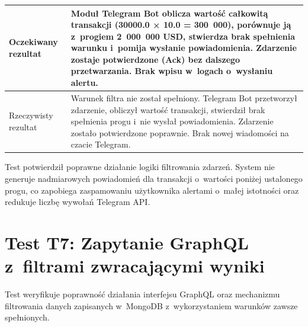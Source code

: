 \begin{table}[H]
\begin{tabular}{|p{}|p{}|}
        Oczekiwany rezultat  & Moduł Telegram Bot oblicza wartość całkowitą transakcji (30000.0 × 10.0 = 300~000), porównuje ją z~progiem 2~000~000 USD, stwierdza brak spełnienia warunku i~pomija wysłanie powiadomienia. Zdarzenie zostaje potwierdzone (Ack) bez dalszego przetwarzania. Brak wpisu w~logach o~wysłaniu alertu.                                                                                              \\ \hline
        Rzeczywisty rezultat & Warunek filtra nie został spełniony. Telegram Bot przetworzył zdarzenie, obliczył wartość transakcji, stwierdził brak spełnienia progu i~nie wysłał powiadomienia. Zdarzenie zostało potwierdzone poprawnie. Brak nowej wiadomości na czacie Telegram.                                                                                                                                            \\ \hline
    \end{tabular}
\end{table}

Test potwierdził poprawne działanie logiki filtrowania zdarzeń.
System nie generuje nadmiarowych powiadomień dla transakcji o~wartości poniżej ustalonego progu, co zapobiega
zaspamowaniu użytkownika alertami o~małej istotności oraz redukuje liczbę wywołań Telegram API\@.

\newpage


\section[Test T7: Zapytanie GraphQL z filtrami zwracającymi wyniki]{Test T7: Zapytanie GraphQL z~filtrami zwracającymi wyniki}
\label{sec:test_graphql_results}

Test weryfikuje poprawność działania interfejsu GraphQL oraz mechanizmu filtrowania danych zapisanych w~MongoDB
z~wykorzystaniem warunków zawsze spełnionych.

\vspace{0.5cm}

